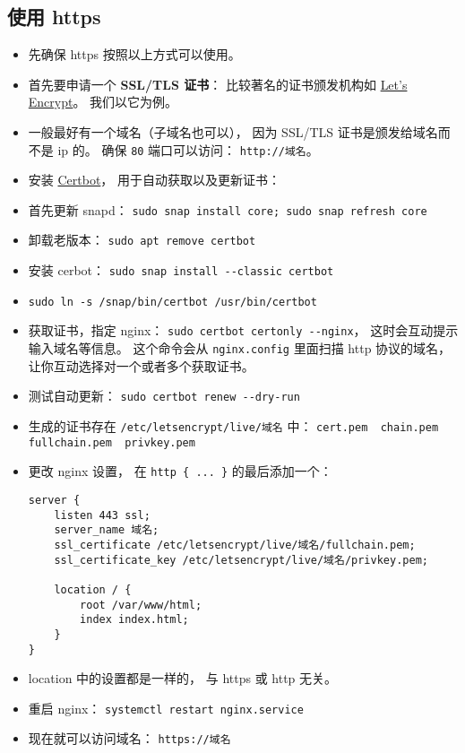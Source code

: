 \subsection{使用 https}
\begin{itemize}
\item 先确保 https 按照以上方式可以使用。
\item 首先要申请一个 \textbf{SSL/TLS 证书}： 比较著名的证书颁发机构如 \href{https://letsencrypt.org/}{Let's Encrypt}。 我们以它为例。
\item 一般最好有一个域名（子域名也可以）， 因为 SSL/TLS 证书是颁发给域名而不是 ip 的。 确保 \verb`80` 端口可以访问： \verb`http://域名`。
\item 安装 \href{https://certbot.eff.org/instructions?ws=nginx&os=ubuntufocal}{Certbot}， 用于自动获取以及更新证书：
\item 首先更新 snapd： \verb`sudo snap install core; sudo snap refresh core`
\item 卸载老版本： \verb`sudo apt remove certbot`
\item 安装 cerbot： \verb`sudo snap install --classic certbot`
\item \verb`sudo ln -s /snap/bin/certbot /usr/bin/certbot`
\item 获取证书，指定 nginx： \verb`sudo certbot certonly --nginx`， 这时会互动提示输入域名等信息。 这个命令会从 \verb`nginx.config` 里面扫描 http 协议的域名， 让你互动选择对一个或者多个获取证书。
\item 测试自动更新： \verb`sudo certbot renew --dry-run`
\item 生成的证书存在 \verb`/etc/letsencrypt/live/域名` 中： \verb`cert.pem  chain.pem  fullchain.pem  privkey.pem`
\item 更改 nginx 设置， 在 \verb`http { ... }` 的最后添加一个：
\begin{lstlisting}[language=none]
server {
    listen 443 ssl;
    server_name 域名;
    ssl_certificate /etc/letsencrypt/live/域名/fullchain.pem;
    ssl_certificate_key /etc/letsencrypt/live/域名/privkey.pem;

    location / {
        root /var/www/html;
        index index.html;
    }
}
\end{lstlisting}
\item location 中的设置都是一样的， 与 https 或 http 无关。
\item 重启 nginx： \verb`systemctl restart nginx.service`
\item 现在就可以访问域名： \verb`https://域名`
\end{itemize}


